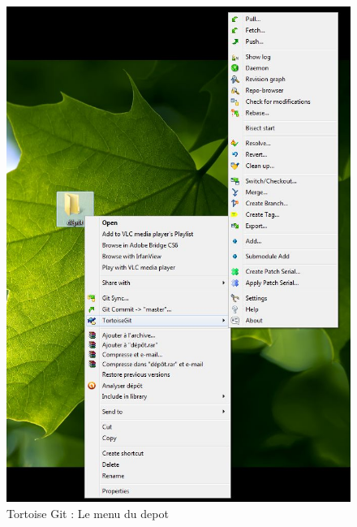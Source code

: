 \begin{figure}[h] 
	\begin{center}
		\includegraphics[scale=0.2]{../IMG/menuTG.jpg}
	\end{center}
	\caption{Tortoise Git : Le menu du depot}
	\label{Tortoise Git : Le menu du depot} 
\end{figure}